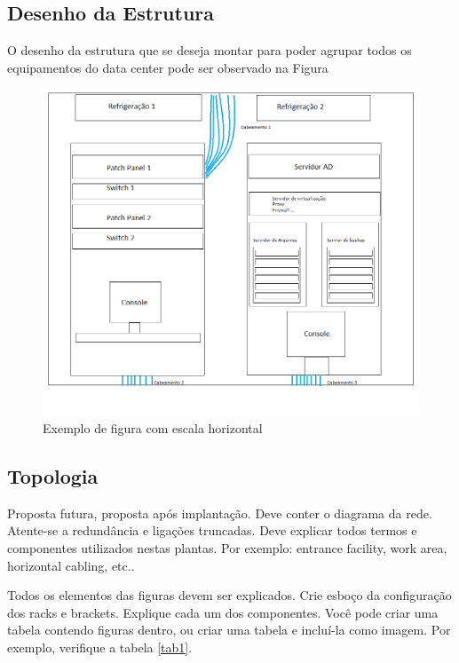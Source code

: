 \documentclass[	DIV=calc,%
							paper=a4,%
							fontsize=12pt,%
							onecolumn]{scrartcl}	 					%
\begin{document}
\subsection{Desenho da Estrutura} 
O desenho da estrutura que se deseja montar para poder agrupar todos os equipamentos do data center pode ser observado na Figura 

\begin{figure}[!htbp]
	\centering
	\includegraphics[width=\textwidth]{./imagens/datacenter.png}
	\caption{Exemplo de figura com escala horizontal}
	\label{fig:desenhoestrutura}
\end{figure}

	
\subsection{Topologia}
Proposta futura, proposta após implantação.
Deve conter o diagrama da rede. Atente-se a redundância  e ligações truncadas.
Deve explicar todos termos e componentes utilizados nestas plantas. Por exemplo: entrance facility, work area, horizontal cabling, etc..

Todos os elementos das figuras devem ser explicados. 
Crie esboço da configuração dos racks e brackets. Explique cada um dos componentes. Você pode criar uma tabela contendo figuras dentro, ou criar uma tabela e incluí-la como imagem. Por exemplo, verifique a tabela \ref{tab1}.


\end{document}
